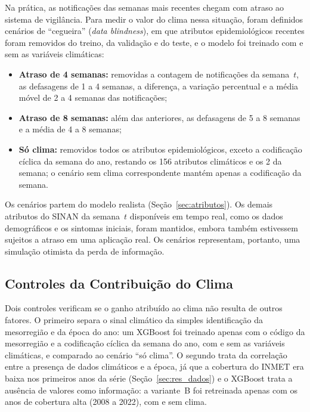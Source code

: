 Na prática, as notificações das semanas mais recentes chegam com atraso ao sistema de vigilância. Para medir o valor do clima nessa situação, foram definidos cenários de ``cegueira'' (\textit{data blindness}), em que atributos epidemiológicos recentes foram removidos do treino, da validação e do teste, e o modelo foi treinado com e sem as variáveis climáticas:

\begin{itemize}
    \item \textbf{Atraso de 4 semanas:} removidas a contagem de notificações da semana~$t$, as defasagens de 1 a 4 semanas, a diferença, a variação percentual e a média móvel de 2 a 4 semanas das notificações;
    \item \textbf{Atraso de 8 semanas:} além das anteriores, as defasagens de 5 a 8 semanas e a média de 4 a 8 semanas;
    \item \textbf{Só clima:} removidos todos os atributos epidemiológicos, exceto a codificação cíclica da semana do ano, restando os 156 atributos climáticos e os 2 da semana; o cenário sem clima correspondente mantém apenas a codificação da semana.
\end{itemize}

Os cenários partem do modelo realista (Seção~\ref{sec:atributos}). Os demais atributos do SINAN da semana~$t$ disponíveis em tempo real, como os dados demográficos e os sintomas iniciais, foram mantidos, embora também estivessem sujeitos a atraso em uma aplicação real. Os cenários representam, portanto, uma simulação otimista da perda de informação.

\subsection{Controles da Contribuição do Clima}
\label{sec:met_controles}

Dois controles verificam se o ganho atribuído ao clima não resulta de outros fatores. O primeiro separa o sinal climático da simples identificação da mesorregião e da época do ano: um XGBoost foi treinado apenas com o código da mesorregião e a codificação cíclica da semana do ano, com e sem as variáveis climáticas, e comparado ao cenário ``só clima''. O segundo trata da correlação entre a presença de dados climáticos e a época, já que a cobertura do INMET era baixa nos primeiros anos da série (Seção~\ref{sec:res_dados}) e o XGBoost trata a ausência de valores como informação: a variante~B foi retreinada apenas com os anos de cobertura alta (2008 a 2022), com e sem clima.

